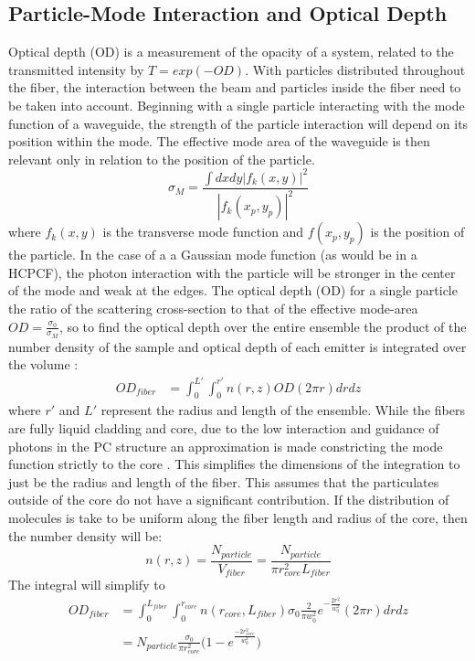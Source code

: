 \subsection{Particle-Mode Interaction and Optical Depth}
Optical depth (OD) is a measurement of the opacity of a system, related to the transmitted intensity by $T = exp(-OD)$. With particles distributed throughout the fiber, the interaction between the beam and particles inside the fiber need to be taken into account. Beginning with a single particle interacting with the mode function of a waveguide, the strength of the particle interaction will depend on its position within the mode\cite{domokos, mazoni}. The effective mode area of the waveguide is then relevant only in relation to the position of the particle. 
\begin{equation}
	\sigma_M = \frac{\int dxdy|f_k(x, y)|^2}{|f_k(x_p, y_p)|^2}
\end{equation}
where $f_k(x,y)$ is the transverse mode function and $f(x_p,y_p )$ is the position of the particle. In the case of a a Gaussian mode function (as would be in a HCPCF), the photon interaction with the particle will be stronger in the center of the mode and weak at the edges. The optical depth (OD) for a single particle the ratio of the scattering cross-section to that of the effective mode-area $OD =\frac{\sigma_0}{\sigma_M}$, so to find the optical depth over the entire ensemble the product of the number density of the sample and optical depth of each emitter is integrated over the volume :
\begin{equation}
	\begin{aligned}
		OD_{fiber} &= \int^{L'}_0 \int^{r'}_0 n(r, z)OD(2\pi r) dr dz 
	\end{aligned}
\end{equation}
where $r'$ and $L'$ represent the radius and length of the ensemble.  While the fibers are fully liquid cladding and core, due to the low interaction and guidance of photons in the PC structure an approximation is made constricting the mode function strictly to the core . This simplifies the dimensions of the integration to just be the radius and length of the fiber. This assumes that the particulates outside of the core do not have a significant contribution.  If the distribution of molecules is take to be uniform along the fiber length and radius of the core, then the number density will be: 
\begin{equation}
	n(r, z) = \frac{N_{particle}}{V_{fiber}} = \frac{N_{particle}}{\pi r_{core}^2L_{fiber}} 
\end{equation}
The integral will simplify to
\begin{equation}
	\begin{aligned}
		OD_{fiber} &= \int^{L_{fiber}}_0 \int^{r_{core}}_0  n(r_{core}, L_{fiber})\sigma_0 \frac{2}{\pi w_0^2}e^{-\frac{2r^2}{w_0^2}}(2\pi r) dr dz\\
		&= N_{particle}\frac{\sigma_0}{\pi r^2_{core}}\big(1-e^{\frac{-2r_{core}^2}{w_0^2}}\big)
	\label{OD}
	\end{aligned}
\end{equation}
